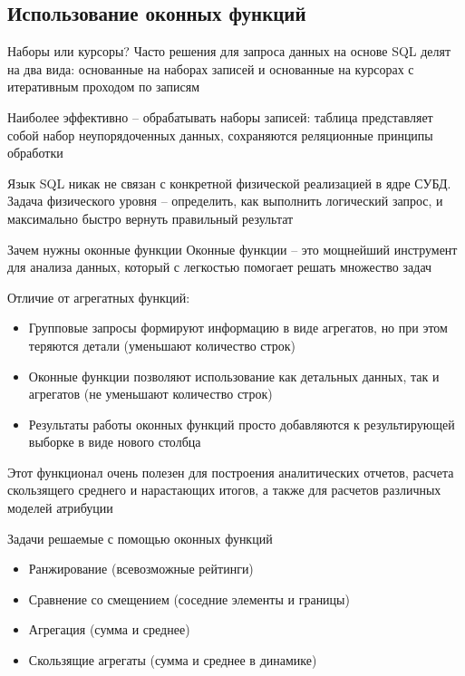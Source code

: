 \documentclass[12pt]{article}
\begin{document}
\newpage 

\subsection{Использование оконных функций}

\begin{Remark}{Наборы или курсоры?}
    Часто решения для запроса данных на основе SQL делят на два вида: основанные на наборах записей и основанные на курсорах с итеративным проходом по записям 

    Наиболее эффективно -- обрабатывать наборы записей: таблица представляет собой набор неупорядоченных данных, сохраняются реляционные принципы обработки 

    Язык SQL никак не связан с конкретной физической реализацией в ядре СУБД. Задача физического уровня -- определить, как выполнить логический запрос, и максимально быстро вернуть правильный результат 
\end{Remark}

\begin{nota}{Зачем нужны оконные функции}
    Оконные функции -- это мощнейший инструмент для анализа данных, который с легкостью помогает решать множество задач 

    Отличие от агрегатных функций:

    \begin{itemize}
        \item Групповые запросы формируют информацию в виде агрегатов, но при этом теряются детали (уменьшают количество строк)
        \item Оконные функции позволяют использование как детальных данных, так и агрегатов (не уменьшают количество строк)
        \item Результаты работы оконных функций просто добавляются к результирующей выборке в виде нового столбца
    \end{itemize}

    Этот функционал очень полезен для построения аналитических отчетов, расчета скользящего среднего и нарастающих итогов, а также для расчетов различных моделей атрибуции 
\end{nota}

\begin{nota}{Задачи решаемые с помощью оконных функций}
    \begin{itemize}
        \item Ранжирование (всевозможные рейтинги)
        \item Сравнение со смещением (соседние элементы и границы)
        \item Агрегация (сумма и среднее)
        \item Скользящие агрегаты (сумма и среднее в динамике)
    \end{itemize}
\end{nota}
\end{document}

